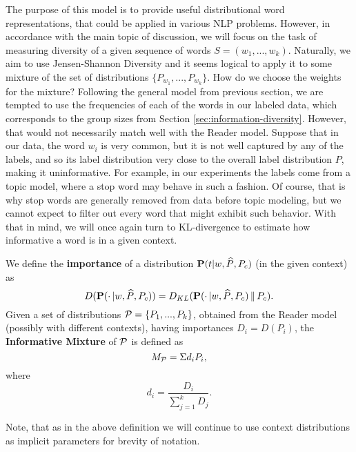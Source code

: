 The purpose of this model is to provide useful distributional
word representations, that could be applied in various NLP
problems. However, in accordance with the main topic of discussion, we will
focus on the task of measuring diversity of a given sequence of words
$S=(w_1,...,w_k)$. Naturally, we aim to use Jensen-Shannon Diversity
and it seems logical to apply it to some mixture of the set of
distributions $\{P_{w_1},...,P_{w_k}\}$. How do we choose the weights
for the mixture? Following the general model from previous section, we
are tempted to use the frequencies of each of the words in our labeled data,
which corresponds to the group sizes from Section
\ref{sec:information-diversity}. However, that would not 
necessarily match well with the Reader model. Suppose that in our
data, the word $w_i$ is very common, but it is not well captured by any of
the labels, and so its label distribution very close to the overall
label distribution $P$, making it uninformative. For example, in our
experiments the labels come from a topic model, where a stop word may
behave in such a fashion. Of course, that is why stop words are
generally removed from data before topic modeling, but we cannot
expect to filter out every word that might exhibit such behavior. With
that in mind, we will once again turn to KL-divergence to
estimate how informative a word is in a given context.

\bed
We define the {\bf importance} of a distribution $\operatorname{\mathbf{P}}(t|w,\widehat{P},P_c)$ (in 
the given context) as
\[D(\operatorname{\mathbf{P}}(\cdot\,|w,\widehat{P},P_c)) =
D_{KL}(\operatorname{\mathbf{P}}(\cdot\,|w,\widehat{P},P_c)\,\|\,P_c).\]
Given a set of distributions ${\mathcal P} = \{P_1,...,P_k\}$, obtained from the
Reader model (possibly with different contexts), having importances
$D_i=D(P_i)$, the {\bf Informative Mixture} of ${\mathcal P}$ is defined as
\[M_{{\mathcal P}} = \Sigma d_i P_i,\]
where
\[d_i = \frac{D_i}{\sum_{j=1}^k D_j}.\]
\eed

Note, that as in the above definition we will continue to use context
distributions as implicit parameters for brevity of notation. 

